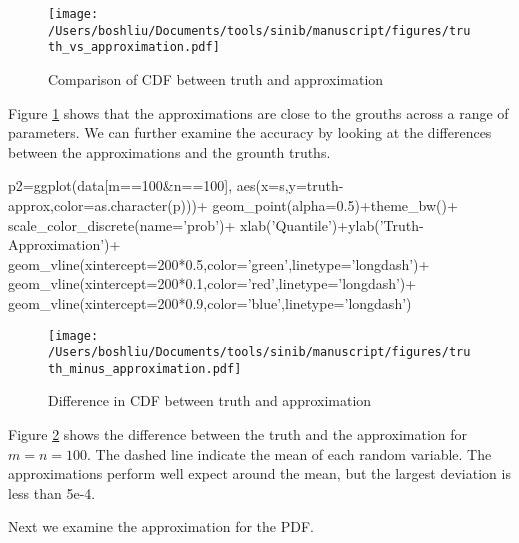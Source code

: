 \begin{figure}[h]
\texttt{[image: /Users/boshliu/Documents/tools/sinib/manuscript/figures/truth\_vs\_approximation.pdf]}
\caption{Comparison of CDF between truth and approximation}
\label{fig:1}
\end{figure}

Figure \ref{fig:1} shows that the approximations are close to the grouths across a range of parameters. We can further examine the accuracy by looking at the differences between the approximations and the grounth truths. 

\begin{example}
p2=ggplot(data[m==100&n==100],
	aes(x=s,y=truth-approx,color=as.character(p)))+
	geom_point(alpha=0.5)+theme_bw()+
	scale_color_discrete(name='prob')+
	xlab('Quantile')+ylab('Truth-Approximation')+
	geom_vline(xintercept=200*0.5,color='green',linetype='longdash')+
	geom_vline(xintercept=200*0.1,color='red',linetype='longdash')+
	geom_vline(xintercept=200*0.9,color='blue',linetype='longdash')
\end{example}

\begin{figure}[h]
\texttt{[image: /Users/boshliu/Documents/tools/sinib/manuscript/figures/truth\_minus\_approximation.pdf]}
\caption{Difference in CDF between truth and approximation}
\label{fig:2}
\end{figure}


Figure \ref{fig:2} shows the difference between the truth and the approximation for $m=n=100$. The dashed line indicate the mean of each random variable. The approximations perform well expect around the mean, but the largest deviation is less than 5e-4. 

Next we examine the approximation for the PDF. 


